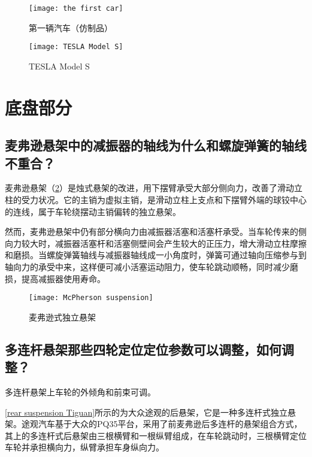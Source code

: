 \documentclass[UTF8]{ctexart}
\numberwithin{figure}{section}
\numberwithin{table}{section}
\begin{document}
\begin{figure}[htbp]
	\centering
	\begin{minipage}[b]{0.4\textwidth}
		\centering
		\texttt{[image: the first car]}
		\caption{第一辆汽车（仿制品）}
		\label{the first car}
	\end{minipage}
	\begin{minipage}[b]{0.55\textwidth}
		\centering
		\texttt{[image: TESLA Model S]}
		\caption{TESLA Model S}
		\label{TESLA Model S}
	\end{minipage}
\end{figure}

\clearpage

\section{底盘部分}
\subsection{麦弗逊悬架中的减振器的轴线为什么和螺旋弹簧的轴线不重合？}

麦弗逊悬架（\cref{McPherson suspension}）是烛式悬架的改进，用下摆臂承受大部分侧向力，改善了滑动立柱的受力状况。它的主销为虚拟主销，是滑动立柱上支点和下摆臂外端的球铰中心的连线，属于车轮绕摆动主销偏转的独立悬架。

然而，麦弗逊悬架中仍有部分横向力由减振器活塞和活塞杆承受。当车轮传来的侧向力较大时，减振器活塞杆和活塞侧壁间会产生较大的正压力，增大滑动立柱摩擦和磨损。当螺旋弹簧轴线与减振器轴线成一小角度时，弹簧可通过轴向压缩参与到轴向力的承受中来，这样便可减小活塞运动阻力，使车轮跳动顺畅，同时减少磨损，提高减振器使用寿命。

\begin{figure}[htbp]
	\centering
	\begin{minipage}[b]{0.8\textwidth}
		\centering
		\texttt{[image: McPherson suspension]}
		\caption{麦弗逊式独立悬架}
		\label{McPherson suspension}
	\end{minipage}
\end{figure}

\subsection{多连杆悬架那些四轮定位定位参数可以调整，如何调整？}

多连杆悬架上车轮的外倾角和前束可调。

\cref{rear suspension Tiguan}所示的为大众途观的后悬架，它是一种多连杆式独立悬架。途观汽车基于大众的PQ35平台，采用了前麦弗逊后多连杆的悬架组合方式，其上的多连杆式后悬架由三根横臂和一根纵臂组成，在车轮跳动时，三根横臂定位车轮并承担横向力，纵臂承担车身纵向力。
\end{document}
